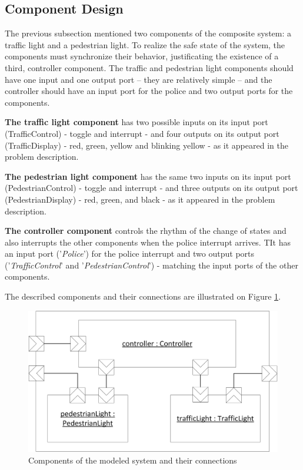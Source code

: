 \subsection{Component Design} \label{subs_casestudycomps}

The previous subsection mentioned two components of the composite system: a traffic light and a pedestrian light. To realize the safe state of the system, the components must synchronize their behavior, justificating the existence of a third, controller component. The traffic and pedestrian light components should have one input and one output port -- they  are relatively simple -- and the controller should have an input port for the police and two output ports for the components.

\textbf{The traffic light component} has two possible inputs on its input port (TrafficControl) - toggle and interrupt - and four outputs on its output port (TrafficDisplay) - red, green, yellow and blinking yellow - as it appeared in the problem description.

\textbf{The pedestrian light component} has the same two inputs on its input port (PedestrianControl) - toggle and interrupt - and three outputs on its output port (PedestrianDisplay) - red, green, and black - as it appeared in the problem description.

\textbf{The controller component} controls the rhythm of the change of states and also interrupts the other components when the police interrupt arrives. TIt has an input port ('\textit{Police}') for the police interrupt and two output ports ('\textit{TrafficControl}' and '\textit{PedestrianControl}') - matching the input ports of the other components.

The described components and their connections are illustrated on Figure \ref{fig_casestudy_blockdiagram}.

\begin{figure}[!ht] 
	\centering
		\includegraphics[width=130mm, keepaspectratio]{figures/casestudy_blockdiagram.png}
	\caption{Components of the modeled system and their connections} 
	\label{fig_casestudy_blockdiagram}
\end{figure}

